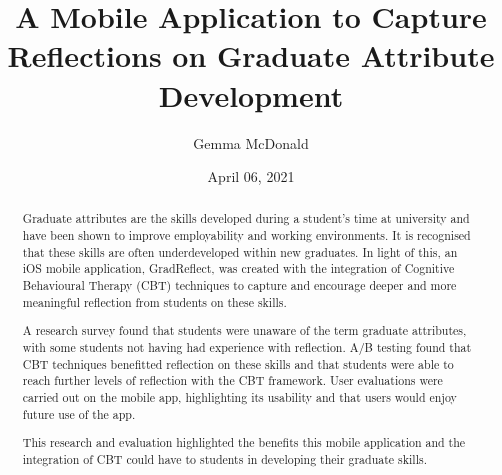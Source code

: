 \documentclass{l4proj}
\begin{document}
\title{A Mobile Application to Capture Reflections on Graduate Attribute Development}
\author{Gemma McDonald}
\date{April 06, 2021}

\maketitle

\begin{abstract}
    Graduate attributes are the skills developed during a student’s time at university and have been shown to improve employability and working environments. It is recognised that these skills are often underdeveloped within new graduates. In light of this, an iOS mobile application, GradReflect, was created with the integration of Cognitive Behavioural Therapy (CBT) techniques to capture and encourage deeper and more meaningful reflection from students on these skills. 

    A research survey found that students were unaware of the term graduate attributes, with some students not having had experience with reflection. A/B testing found that CBT techniques benefitted reflection on these skills and that students were able to reach further levels of reflection with the CBT framework. User evaluations were carried out on the mobile app, highlighting its usability and that users would enjoy future use of the app. 

    This research and evaluation highlighted the benefits this mobile application and the integration of CBT could have to students in developing their graduate skills.
\end{abstract}


%
%
\def\consentname {Gemma McDonald} %
\def\consentdate {06 April 2021} %
%
\educationalconsent
\end{document}
